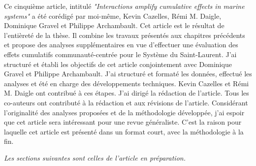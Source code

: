 Ce cinquième article, intitulé \textit{"Interactions amplify cumulative effects in marine systems"} a été corédigé par moi-même, Kevin Cazelles, Rémi M. Daigle, Dominique Gravel et Philippe Archambault. Cet article est le résultat de l'entièreté de la thèse. Il combine les travaux présentés aux chapitres précédents et propose des analyses supplémentaires en vue d'effectuer une évaluation des effets cumulatifs communauté-centrée pour le Système du Saint-Laurent. J'ai structuré et établi les objectifs de cet article conjointement avec Dominique Gravel et Philippe Archambault. J'ai structuré et formaté les données, effectué les analyses et été en charge des développements techniques. Kevin Cazelles et Rémi M. Daigle ont contribué à ces étapes. J'ai dirigé la rédaction de l'article. Tous les co-auteurs ont contributé à la rédaction et aux révisions de l'article. Considérant l'originalité des analyses proposées et de la méthodologie développée, j'ai espoir que cet article sera intéressant pour une revue généraliste. C'est la raison pour laquelle cet article est présenté dans un format court, avec la méthodologie à la fin. \linebreak[4]


\textit{Les sections suivantes sont celles de l'article en préparation.}
